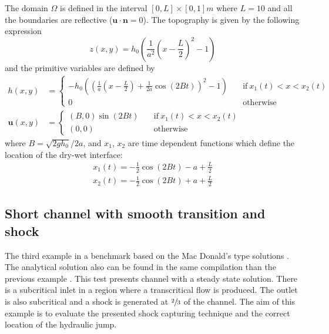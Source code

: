\documentclass[a4paper,12pt]{article}
\begin{document}
The domain $\Omega$ is defined in the interval $[0,L]\times[0,1]m$ where $L=10$ and all the boundaries are reflective ($\mathbf{u}\cdot\mathbf{n} = 0$). The topography is given by the following expression
\begin{equation}
z(x,y) = h_0 \left(\frac{1}{a^2}\left(x - \frac{L}{2}\right)^2 - 1\right)
\end{equation}
and the primitive variables are defined by
\begin{subequations}
\begin{align}
h(x,y) &=
\begin{cases}
-h_0\left(\left(\frac{1}{a}\left(x - \frac{L}{2}\right) + \frac{1}{2a}\cos(2Bt)\right)^2 - 1\right)
\quad &\text{if} \ x_1(t) < x < x_2(t) \\
0 \quad &\text{otherwise}
\end{cases} \\
\mathbf{u}(x,y) &=
\begin{cases}
(B,0)\sin(2Bt) \quad &\text{if} \ x_1(t) < x < x_2(t) \\
(0,0) \quad &\text{otherwise}
\end{cases}
\end{align}
\end{subequations}
where $B=\sqrt{2gh_0}/2a$, and $x_1$, $x_2$ are time dependent functions which define the location of the dry-wet interface:
\begin{equation}
\begin{split}
x_1(t) = -\frac{1}{2}\cos(2Bt) - a + \frac{L}{2} \\
x_2(t) = -\frac{1}{2}\cos(2Bt) + a + \frac{L}{2}
\end{split}
\end{equation}


\subsection{Short channel with smooth transition and shock}

The third example in a benchmark based on the Mac Donald's type solutions \cite{macdonald1997}. The analytical solution also can be found in the same compilation than the previous example \cite{delestre2013}. This test presents channel with a steady state solution. There is a subcritical inlet in a region where a transcritical flow is produced. The outlet is also subcritical and a shock is generated at $\sfrac{2}{3}$ of the channel. The aim of this example is to evaluate the presented shock capturing technique and the correct location of the hydraulic jump.
\end{document}
